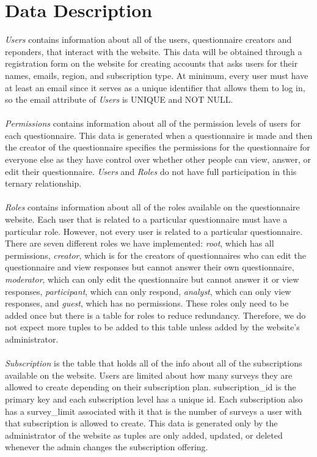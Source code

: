\documentclass[12pt, oneside]{article}
\begin{document}
    \section{Data Description}
    \emph{Users} contains information about all of the users, questionnaire creators and reponders, that interact with the website. This data will be obtained through a registration form on the website for creating accounts that asks users for their names, emails, region, and subscription type. At minimum, every user must have at least an email since it serves as a unique identifier that allows them to log in, so the email attribute of \emph{Users} is UNIQUE and NOT NULL.
    \\
    \\
    \emph{Permissions} contains information about all of the permission levels of users for each questionnaire. This data is generated when a questionnaire is made and then the creator of the questionnaire specifies the permissions for the questionnaire for everyone else as they have control over whether other people can view, answer, or edit their questionnaire. \emph{Users} and \emph{Roles} do not have full participation in this ternary relationship.
    \\
    \\
    \emph{Roles} contains information about all of the roles available on the questionnaire website. Each user that is related to a particular questionnaire must have a particular role. However, not every user is related to a particular questionnaire. There are seven different roles we have implemented: \emph{root}, which has all permissions, \emph{creator}, which is for the creators of questionnaires who can edit the questionnaire and view responses but cannot answer their own questionnaire, \emph{moderator}, which can only edit the questionnaire but cannot answer it or view responses, \emph{participant}, which can only respond, \emph{analyst}, which can only view responses, and \emph{guest}, which has no permissions. These roles only need to be added once but there is a table for roles to reduce redundancy. Therefore, we do not expect more tuples to be added to this table unless added by the website's administrator.
    \\
    \\
    \emph{Subscription} is the table that holds all of the info about all of the subscriptions available on the website. Users are limited about how many surveys they are allowed to create depending on their subscription plan. subscription\_id is the primary key and each subscription level has a unique id. Each subscription also has a survey\_limit associated with it that is the number of surveys a user with that subscription is allowed to create. This data is generated only by the administrator of the website as tuples are only added, updated, or deleted whenever the admin changes the subscription offering.
\end{document}
